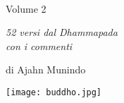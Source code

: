 
\vspace*{1em}

{\centering

\\[0.4\baselineskip]
Volume 2
\vspace*{3\baselineskip}

{\itshape 52 versi dal Dhammapada\\
con i commenti}

\vspace*{2\baselineskip}
di Ajahn Munindo

\vfill

\texttt{[image: buddho.jpg]}
\vspace*{1.3em}


}
